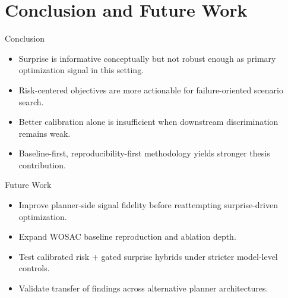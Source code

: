 \section{Conclusion and Future Work}

\begin{frame}{Conclusion}
\begin{itemize}
    \item Surprise is informative conceptually but not robust enough as primary optimization signal in this setting.
    \item Risk-centered objectives are more actionable for failure-oriented scenario search.
    \item Better calibration alone is insufficient when downstream discrimination remains weak.
    \item Baseline-first, reproducibility-first methodology yields stronger thesis contribution.
\end{itemize}
\end{frame}

\begin{frame}{Future Work}
\begin{itemize}
    \item Improve planner-side signal fidelity before reattempting surprise-driven optimization.
    \item Expand WOSAC baseline reproduction and ablation depth.
    \item Test calibrated risk + gated surprise hybrids under stricter model-level controls.
    \item Validate transfer of findings across alternative planner architectures.
\end{itemize}
\end{frame}
